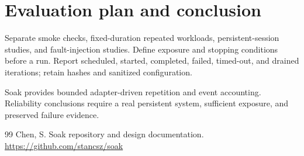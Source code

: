 \documentclass[11pt]{article}
\begin{document}
\section{Evaluation plan and conclusion}
Separate smoke checks, fixed-duration repeated workloads, persistent-session studies, and fault-injection studies. Define exposure and stopping conditions before a run. Report scheduled, started, completed, failed, timed-out, and drained iterations; retain hashes and sanitized configuration.\par
Soak provides bounded adapter-driven repetition and event accounting. Reliability conclusions require a real persistent system, sufficient exposure, and preserved failure evidence.\par
\begin{thebibliography}{99}
 Chen, S. Soak repository and design documentation. \url{https://github.com/stancsz/soak}
\end{thebibliography}
\end{document}
